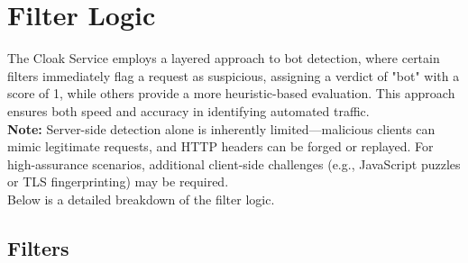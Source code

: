 \documentclass[12pt,a4paper]{article}
\begin{document}
\newpage
\section{Filter Logic}

The Cloak Service employs a layered approach to bot detection, where certain filters immediately flag a request as suspicious, assigning a verdict of "bot" with a score of 1, while others provide a more heuristic-based evaluation. This approach ensures both speed and accuracy in identifying automated traffic. \\
\textbf{Note:} Server-side detection alone is inherently limited—malicious clients can mimic legitimate requests, and HTTP headers can be forged or replayed. For high-assurance scenarios, additional client-side challenges (e.g., JavaScript puzzles or TLS fingerprinting) may be required. \\
Below is a detailed breakdown of the filter logic.

\subsection{Filters}
\end{document}
